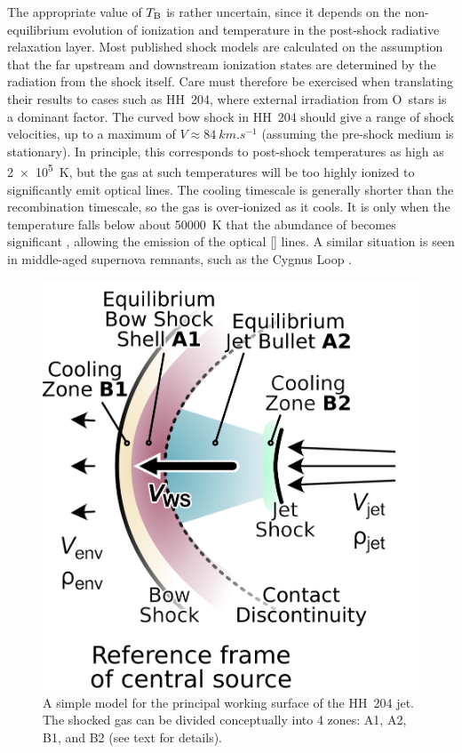\documentclass[twocolumn]{aastex63}
\begin{document}
The appropriate value of \(T_\mathrm{B}\) is rather uncertain,
since it depends on the non-equilibrium evolution of ionization and temperature
in the post-shock radiative relaxation layer.
Most published shock models \citep{Cox:1985a, Sutherland:2017a}
are calculated on the assumption that the
far upstream and downstream ionization states are determined by the radiation from the shock itself.
Care must therefore be exercised when translating their results to cases such as HH~204,
where external irradiation from O~stars is a dominant factor.
The curved bow shock in HH~204 should give a range of shock velocities,
up to a maximum of \(V \approx \SI{84}{km.s^{-1}}\) (assuming the pre-shock medium is stationary).
In principle, this corresponds to post-shock temperatures as high as \SI{2e5}{K},
but the gas at such temperatures will be too highly ionized to significantly emit optical lines.
The cooling timescale is generally shorter than the recombination timescale,
so the gas is over-ionized as it cools.
It is only when the temperature falls below about \SI{50000}{K} that the abundance
of  becomes significant \citetext{e.g., Fig.~11 of \citealp{Allen:2008a}},
allowing the emission of the optical [] lines.
A similar situation is seen in middle-aged supernova remnants,
such as the Cygnus Loop \citep{Raymond:2020a}. 

\begin{figure}
  \includegraphics[width=\linewidth]{working-surface-hh204-single}
  \caption{
    A simple model for the principal working surface of the HH~204 jet.
    The shocked gas can be divided conceptually into 4 zones:
    A1, A2, B1, and B2 (see text for details).
  }
  \label{fig:working-surface}
\end{figure}
\end{document}
